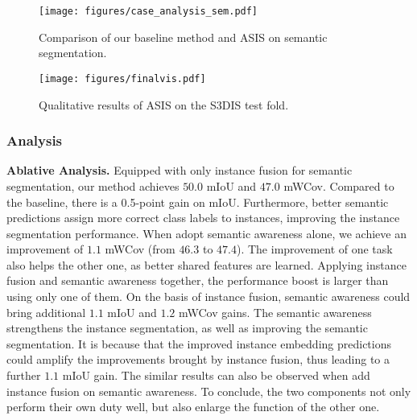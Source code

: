 \documentclass[10pt,twocolumn,letterpaper]{article}
\newcommand{\myparagraph}[1]{{\vspace{0.5em} \noindent \bf #1}}
\begin{document}
\begin{figure}[!tb]
\texttt{[image: figures/case\_analysis\_sem.pdf]}
\caption{Comparison of our baseline method and ASIS on semantic segmentation.}
\label{fig:case_analysis_sem}
\vspace{-0.2cm}
\end{figure}

\begin{figure*}[!tb]
\texttt{[image: figures/finalvis.pdf]}
\caption{Qualitative results of ASIS on the  S3DIS test fold.}
\label{fig:finalvis}
\vspace{-0.3cm}
\end{figure*}


\subsubsection{Analysis}
\label{subsubsec:ablation}
\myparagraph{Ablative Analysis.}
Equipped with only instance fusion for semantic segmentation, our method achieves $50.0$ mIoU and $47.0$ mWCov. Compared to the baseline, there is a 0.5-point gain on mIoU. 
Furthermore, better semantic predictions assign more correct class labels to instances, improving the instance segmentation performance.
When adopt semantic awareness alone, we achieve an improvement of $1.1$ mWCov (from $46.3$ to $47.4$). 
The improvement of one task also helps the other one, as better shared features are learned.  
Applying instance fusion and semantic awareness together, the performance boost is larger than using only one of them. 
On the basis of instance fusion, semantic awareness could bring additional $1.1$ mIoU and $1.2$ mWCov gains.
The semantic awareness strengthens the instance segmentation, as well as improving the semantic segmentation.
It is because that the improved instance embedding predictions could amplify the improvements brought by instance fusion, thus leading to a further $1.1$ mIoU gain.
The similar results can also be observed when add instance fusion on semantic awareness.
To conclude, the two components not only perform their own duty well, but also enlarge the function of the other one.
\end{document}
